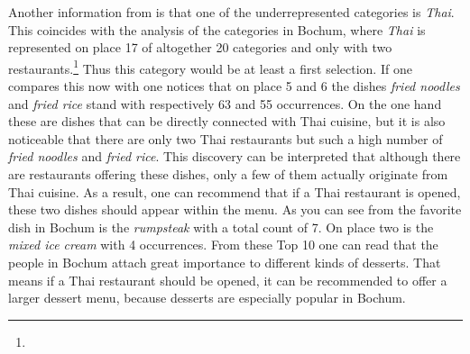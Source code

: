 Another information from  is that one of the underrepresented categories is \textit{Thai}.
This coincides with the analysis of the categories in Bochum, where \textit{Thai} is represented on place 17 of altogether 20 categories and only with two restaurants.\footnote{}
Thus this category would be at least a first selection.
If one compares this now with  one notices that on place 5 and 6 the dishes \textit{fried noodles} and \textit{fried rice} stand with respectively 63 and 55 occurrences.
On the one hand these are dishes that can be directly connected with Thai cuisine,
but it is also noticeable that there are only two Thai restaurants but such a high number of \textit{fried noodles} and \textit{fried rice}.
This discovery can be interpreted that although there are restaurants offering these dishes, only a few of them actually originate from Thai cuisine.
As a result, one can recommend that if a Thai restaurant is opened, these two dishes should appear within the menu.
As you can see from  the favorite dish in Bochum is the \textit{rumpsteak} with a total count of 7.
On place two is the \textit{mixed ice cream} with 4 occurrences.
From these Top 10 one can read that the people in Bochum attach great importance to different kinds of desserts.
That means if a Thai restaurant should be opened, it can be recommended to offer a larger dessert menu, because desserts are especially popular in Bochum.
